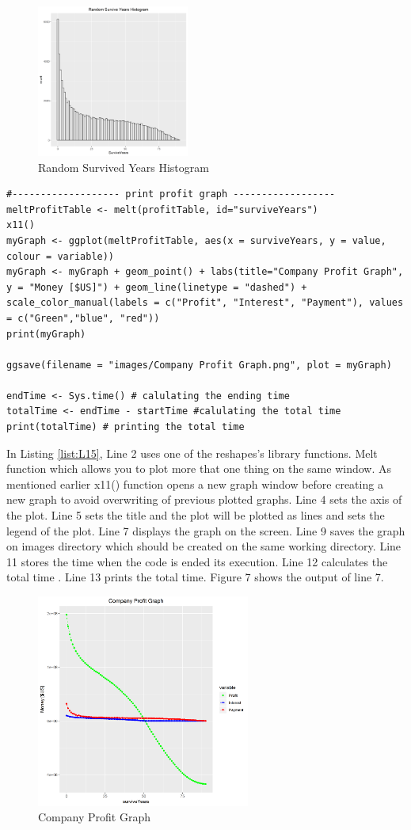 \documentclass[12pt]{article}
\begin{document}
\begin{figure}[h]
	\centering
	\includegraphics[width=0.5\linewidth, height=5cm]{S6.png}
	\caption{Random Survived Years Histogram}

\end{figure}
\pagebreak
\begin{lstlisting}[caption={Company Profit Graph},captionpos=b,label={list:L15}]
#------------------- print profit graph ------------------
meltProfitTable <- melt(profitTable, id="surviveYears")
x11()
myGraph <- ggplot(meltProfitTable, aes(x = surviveYears, y = value, colour = variable))
myGraph <- myGraph + geom_point() + labs(title="Company Profit Graph", y = "Money [$US]") + geom_line(linetype = "dashed") +
scale_color_manual(labels = c("Profit", "Interest", "Payment"), values = c("Green","blue", "red")) 
print(myGraph)

ggsave(filename = "images/Company Profit Graph.png", plot = myGraph)

endTime <- Sys.time() # calulating the ending time
totalTime <- endTime - startTime #calulating the total time
print(totalTime) # printing the total time
\end{lstlisting}
In Listing \ref{list:L15}, Line 2 uses one of the reshapes's library functions. Melt function which allows you to plot more that one thing on the same window. As mentioned earlier x11() function opens a new graph window before creating a new graph to avoid overwriting of previous plotted graphs. Line 4 sets the axis of the plot. Line 5 sets the title and the plot will be plotted as lines and sets the legend of the plot. Line 7 displays the graph on the screen. Line 9 saves the graph on images directory which should be created on the same working directory. Line 11 stores the time when the code is ended its execution. Line 12 calculates the total time . Line 13 prints the total time. Figure 7 shows the output of line 7.
\clearpage
\begin{figure}[h]
	\centering
	\includegraphics[width=0.7\linewidth, height=7cm]{S7.png}
	\caption{Company Profit Graph}

\end{figure}
\end{document}
